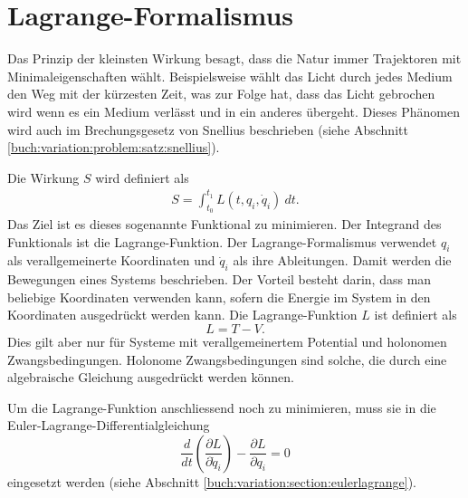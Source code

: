 \section{Lagrange-Formalismus}
Das Prinzip der kleinsten Wirkung besagt, dass die Natur immer Trajektoren
mit Minimaleigenschaften wählt.
Beispielsweise wählt das Licht durch jedes Medium den Weg mit der kürzesten Zeit, was zur Folge hat,
dass das Licht gebrochen wird wenn es ein Medium verlässt und in ein anderes übergeht.
Dieses Phänomen wird auch im Brechungsgesetz von Snellius beschrieben
(siehe Abschnitt \ref{buch:variation:problem:satz:snellius}).

Die Wirkung \(S\) wird definiert als
\begin{align*}
    S = \int_{t_0}^{t_1} L(t,q_i,\dot{q}_i) \: dt.
\end{align*}
Das Ziel ist es dieses sogenannte Funktional zu minimieren.
Der Integrand des Funktionals ist die Lagrange-Funktion.
Der Lagrange-Formalismus verwendet \(q_i\) als verallgemeinerte Koordinaten
und \(\dot{q}_i\) als ihre Ableitungen.
Damit werden die Bewegungen eines Systems beschrieben.
Der Vorteil besteht darin, dass man beliebige Koordinaten verwenden kann,
sofern die Energie im System in den Koordinaten ausgedrückt werden kann.
Die Lagrange-Funktion \(L\) ist definiert als
\begin{equation}
    L = T - V.
    \label{eq:lagrange} 
\end{equation}
Dies gilt aber nur für Systeme mit verallgemeinertem Potential und holonomen Zwangsbedingungen.
Holonome Zwangsbedingungen sind solche, die durch eine algebraische Gleichung
ausgedrückt werden können.

Um die Lagrange-Funktion anschliessend noch zu minimieren, muss sie in die
Euler-Lagrange-Differentialgleichung
\begin{equation*}
    \frac{d}{dt} \left( \frac{\partial L}{\partial \dot{q}_i} \right) 
    - \frac{\partial L}{\partial q_i} = 0
\end{equation*}
eingesetzt werden
(siehe Abschnitt \ref{buch:variation:section:eulerlagrange}).





